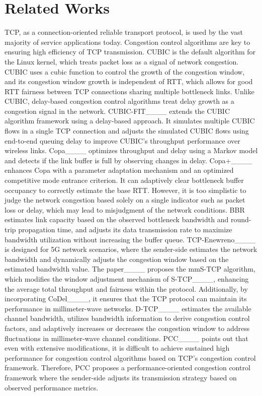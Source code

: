 \section{Related Works}
TCP, as a connection-oriented reliable transport protocol, is used by the vast majority of service applications today. Congestion control algorithms are key to ensuring high efficiency of TCP transmission. CUBIC is the default algorithm for the Linux kernel, which treats packet loss as a signal of network congestion. CUBIC uses a cubic function to control the growth of the congestion window, and its congestion window growth is independent of RTT, which allows for good RTT fairness between TCP connections sharing multiple bottleneck links. Unlike CUBIC, delay-based congestion control algorithms treat delay growth as a congestion signal in the network. CUBIC-FIT____ extends the CUBIC algorithm framework using a delay-based approach. It simulates multiple CUBIC flows in a single TCP connection and adjusts the simulated CUBIC flows using end-to-end queuing delay to improve CUBIC's throughput performance over wireless links. Copa____ optimizes throughput and delay using a Markov model and detects if the link buffer is full by observing changes in delay. Copa+____ enhances Copa with a parameter adaptation mechanism and an optimized competitive mode entrance criterion. It can adaptively clear bottleneck buffer occupancy to correctly estimate the base RTT. However, it is too simplistic to judge the network congestion based solely on a single indicator such as packet loss or delay, which may lead to misjudgment of the network conditions. BBR estimates link capacity based on the observed bottleneck bandwidth and round-trip propagation time, and adjusts its data transmission rate to maximize bandwidth utilization without increasing the buffer queue. TCP-Enewreno____ is designed for 5G network scenarios, where the sender-side estimates the network bandwidth and dynamically adjusts the congestion window based on the estimated bandwidth value. The paper____ proposes the mmS-TCP algorithm, which modifies the window adjustment mechanism of S-TCP____, enhancing the average total throughput and fairness within the protocol. Additionally, by incorporating CoDel____, it ensures that the TCP protocol can maintain its performance in millimeter-wave networks. D-TCP____ estimates the available channel bandwidth, utilizes bandwidth information to derive congestion control factors, and adaptively increases or decreases the congestion window to address fluctuations in millimeter-wave channel conditions. PCC____ points out that even with extensive modifications, it is difficult to achieve sustained high performance for congestion control algorithms based on TCP's congestion control framework. Therefore, PCC proposes a performance-oriented congestion control framework where the sender-side adjusts its transmission strategy based on observed performance metrics.

